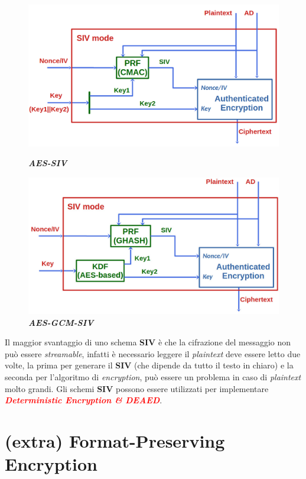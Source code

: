 \begin{flushleft}
    \begin{figure}[h]
        \centering
        \begin{minipage}[t]{0.45\textwidth}
            \centering
            \includegraphics[width=\textwidth]{img/aes_siv.png}
            \caption{\textbf{\textit{AES-SIV}}}
        \end{minipage}
        \hfill
        \begin{minipage}[t]{0.45\textwidth}
            \centering
            \includegraphics[width=\textwidth]{img/aes_gcm_siv.jpg}
            \caption{\textbf{\textit{AES-GCM-SIV}}}
        \end{minipage}
    \end{figure}
    Il maggior svantaggio di uno schema \textbf{SIV} è che la cifrazione del messaggio non può essere \textit{streamable}, infatti è necessario leggere il \textit{plaintext} deve essere letto due volte, la prima per generare il \textbf{SIV} (che dipende da tutto il testo in chiaro) e la seconda per l'algoritmo di \textit{encryption}, può essere un problema in caso di \textit{plaintext} molto grandi. Gli schemi \textbf{SIV} possono essere utilizzati per implementare \textcolor{red}{\textbf{\textit{Deterministic Encryption \& DEAED}}}.
\end{flushleft}

\section{(extra) Format-Preserving Encryption}